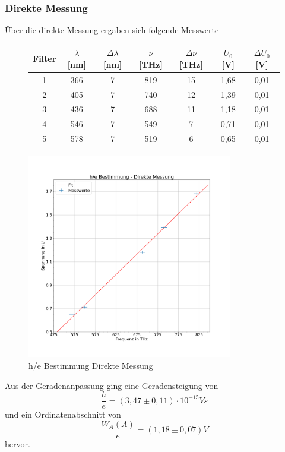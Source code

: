 \documentclass{scrartcl}
\begin{document}
		\subsubsection{Direkte Messung}
			Über die direkte Messung ergaben sich folgende Messwerte 
			\begin{figure}[H]
				\centering
				\begin{tabular}{|c|c|c|c|c|c|c|}
					\hline
					Filter & $\lambda$ [nm] & $\Delta\lambda$ [nm] & $\nu$ [THz] & $\Delta\nu$ [THz] & $U_0$ [V] & $\Delta U_0$ [V] \\
					\hline
					1 & 366 & 7 & 819 & 15 & 1,68 & 0,01\\
					2 & 405 & 7 & 740 & 12 & 1,39 & 0,01\\ 
					3 & 436 & 7 & 688 & 11 & 1,18 & 0,01\\
					4 & 546 & 7 & 549 & 7 & 0,71 & 0,01\\
					5 & 578 & 7 & 519 & 6 & 0,65 & 0,01\\
					\hline
				\end{tabular}
			\end{figure}
			\begin{figure}[H]
				\centering
				\includegraphics[width=0.8\textwidth]{he_direkt.png}
				\caption{h/e Bestimmung Direkte Messung}
			\end{figure}
			Aus der Geradenanpassung ging eine Geradensteigung von 
			\begin{equation}
				\frac{h}{e}= (3,47\pm 0,11)\cdot 10^{-15}V s
			\end{equation}
			und ein Ordinatenabschnitt von
			\begin{equation}
				\frac{W_A(A)}{e} = (1,18\pm 0,07)V
			\end{equation}
			hervor.
\end{document}
